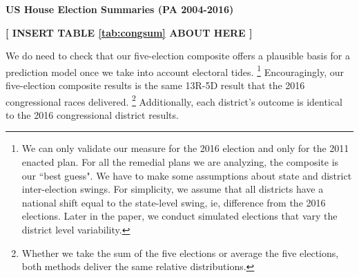 \par
    \begin{center}    \textbf{US House Election Summaries (PA 2004-2016)} \par \end{center}
    \begin{center}   \textbf{[ INSERT TABLE \ref{tab:congsum} ABOUT HERE ]} \end{center}
\par
    We do need to check that our five-election composite offers a plausible basis for a prediction model once we take into account electoral tides. 
		\footnote{We can only validate our measure for the 2016 election and only for the 2011 enacted plan. For all the remedial plans we are analyzing, the composite is our ``best guess". We have to make some assumptions about state and district inter-election swings. For simplicity, we assume that all districts have a national shift equal to the state-level swing, ie, difference from the 2016 elections. Later in the paper, we conduct simulated elections that vary the district level variability.}
    Encouragingly, our five-election composite results is the same 13R-5D result that the 2016 congressional races delivered.  
		\footnote{Whether we take the sum of the five elections or average the five elections, both methods deliver the same relative distributions.}
    Additionally, each district's outcome is identical to the 2016 congressional district results. 
\par
